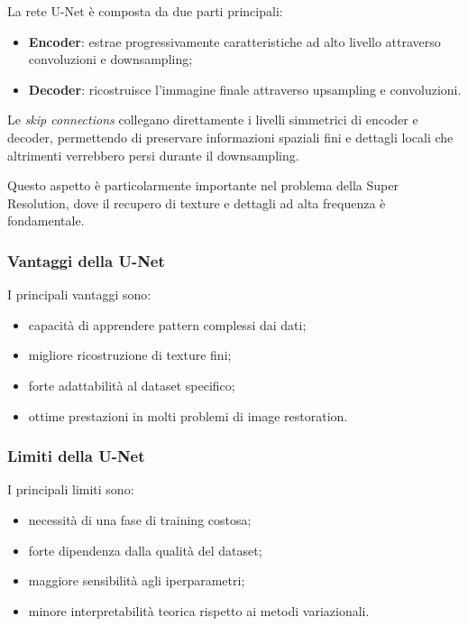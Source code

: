 \documentclass{article}
\begin{document}
La rete U-Net è composta da due parti principali:

\begin{itemize}
    \item \textbf{Encoder}: estrae progressivamente caratteristiche ad alto livello attraverso convoluzioni e downsampling;
    \item \textbf{Decoder}: ricostruisce l’immagine finale attraverso upsampling e convoluzioni.
\end{itemize}

Le \textit{skip connections} collegano direttamente i livelli simmetrici di encoder e decoder, permettendo di preservare informazioni spaziali fini e dettagli locali che altrimenti verrebbero persi durante il downsampling.

Questo aspetto è particolarmente importante nel problema della Super Resolution, dove il recupero di texture e dettagli ad alta frequenza è fondamentale.

\subsubsection{Vantaggi della U-Net}

I principali vantaggi sono:

\begin{itemize}
    \item capacità di apprendere pattern complessi dai dati;
    \item migliore ricostruzione di texture fini;
    \item forte adattabilità al dataset specifico;
    \item ottime prestazioni in molti problemi di image restoration.
\end{itemize}

\subsubsection{Limiti della U-Net}

I principali limiti sono:

\begin{itemize}
    \item necessità di una fase di training costosa;
    \item forte dipendenza dalla qualità del dataset;
    \item maggiore sensibilità agli iperparametri;
    \item minore interpretabilità teorica rispetto ai metodi variazionali.
\end{itemize}
\end{document}
